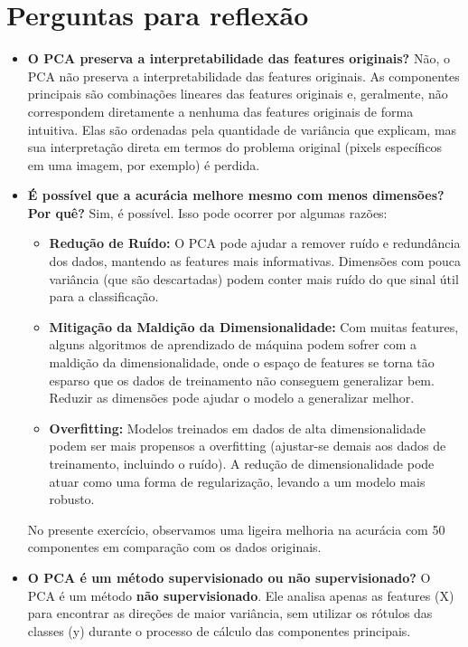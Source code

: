 \documentclass{article}
\begin{document}
\section{Perguntas para reflexão}
\begin{itemize}
    \item \textbf{O PCA preserva a interpretabilidade das features originais?} Não, o PCA não preserva a interpretabilidade das features originais. As componentes principais são combinações lineares das features originais e, geralmente, não correspondem diretamente a nenhuma das features originais de forma intuitiva. Elas são ordenadas pela quantidade de variância que explicam, mas sua interpretação direta em termos do problema original (pixels específicos em uma imagem, por exemplo) é perdida.
    \item \textbf{É possível que a acurácia melhore mesmo com menos dimensões? Por quê?} Sim, é possível. Isso pode ocorrer por algumas razões:
        \begin{itemize}
            \item \textbf{Redução de Ruído:} O PCA pode ajudar a remover ruído e redundância dos dados, mantendo as features mais informativas. Dimensões com pouca variância (que são descartadas) podem conter mais ruído do que sinal útil para a classificação.
            \item \textbf{Mitigação da Maldição da Dimensionalidade:} Com muitas features, alguns algoritmos de aprendizado de máquina podem sofrer com a maldição da dimensionalidade, onde o espaço de features se torna tão esparso que os dados de treinamento não conseguem generalizar bem. Reduzir as dimensões pode ajudar o modelo a generalizar melhor.
            \item \textbf{Overfitting:} Modelos treinados em dados de alta dimensionalidade podem ser mais propensos a overfitting (ajustar-se demais aos dados de treinamento, incluindo o ruído). A redução de dimensionalidade pode atuar como uma forma de regularização, levando a um modelo mais robusto.
        \end{itemize}
        No presente exercício, observamos uma ligeira melhoria na acurácia com 50 componentes em comparação com os dados originais.
    \item \textbf{O PCA é um método supervisionado ou não supervisionado?} O PCA é um método \textbf{não supervisionado}. Ele analisa apenas as features (X) para encontrar as direções de maior variância, sem utilizar os rótulos das classes (y) durante o processo de cálculo das componentes principais.
\end{itemize}
\end{document}
